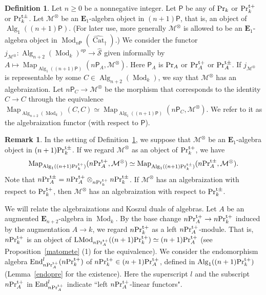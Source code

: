 \documentclass[leqno,12pt]{amsart}
\theoremstyle{plain}
\theoremstyle{definition}
\newtheorem{Definition}[Theorem]{Definition}
\newtheorem{Remark}[Theorem]{Remark}
\newcommand{\PR}{\textup{Pr}}
\newcommand{\PRTT}{\textup{Pr}^{\textup{t}+}}
\newcommand{\PRTTT}{\textup{Pr}^{\textup{t}\pm}}
\newcommand{\MMM}{\mathcal{M}}
\newcommand{\Mod}{\operatorname{Mod}}
\newcommand{\wSSS}{\widehat{\mathcal{S}}}
\newcommand{\Map}{\operatorname{Map}}
\newcommand{\Alg}{\operatorname{Alg}}
\newcommand{\End}{\operatorname{End}}
\newcommand{\vCat}{\widehat{\operatorname{Cat}}_\dagger}
\newcommand{\eone}{\mathbf{E}_1}
\newcommand{\LMod}{\operatorname{LMod}}
\begin{document}
\begin{Definition}
\label{algebraizationdef}
Let $n\ge0$ be a nonnegative integer.
Let $\mathsf{P}$ be any of $\PR_k$ or $\PRTT_k$ or $\PRTTT_k$.
Let $\MMM^\otimes$ be an $\eone$-algebra object in $(n+1)\mathsf{P}$, that is, an object of $\Alg_1((n+1)\mathsf{P})$.
(For later use, more generally $\MMM^\otimes$ is allowed to be an $\eone$-algebra object in $\Mod_{n\mathsf{P}}(\vCat)$.)
We consider the functor $j_{\MMM^\otimes}:\Alg_{n+2}(\Mod_k)^{op}\to \wSSS$ given informally by $A\mapsto \Map_{\Alg_1((n+1)\mathsf{P})}(n\mathsf{P}_A,\MMM^\otimes)$.
Here $\mathsf{P}_A$ is $\PR_A$ or $\PRTT_A$ or $\PRTTT_A$.
If $j_{\MMM^\otimes}$ is representable by some $C\in \Alg_{n+2}(\Mod_k)$, we say that $\MMM^{\otimes}$ has an algebraization.
Let $n\mathsf{P}_C\to \MMM^\otimes$ be the morphism
that corresponds to the identity $C\to C$ through the equivalence $\Map_{\Alg_{n+2}(\Mod_k)}(C,C)\simeq \Map_{\Alg_1((n+1)\mathsf{P})}(n\mathsf{P}_C,\MMM^\otimes)$.
We refer to it as the algebraization functor  (with respect to $\mathsf{P}$).
\end{Definition}








\begin{Remark}
In the setting of Definition~\ref{algebraizationdef},
we suppose that  $\MMM^\otimes$ be an $\eone$-algebra object in $(n+1)\PRTTT_k$.
If we regard $\MMM^\otimes$ as an object of $\PRTT_k$, we have
\[
\Map_{\Alg_1((n+1)\PRTT_k)}(n\PRTT_A,\MMM^\otimes)\simeq \Map_{\Alg_1((n+1)\PRTTT_k)}(n\PRTTT_A,\MMM^\otimes).
\]
Note that $n\PRTTT_A=n\PRTT_A\otimes_{n\PRTT_k}n\PRTTT_k$.
If $\MMM^\otimes$ has an algebraization with respect to $\PRTT_k$, then $\MMM^\otimes$  has an algebraization with respect to $\PRTTT_k$.
\end{Remark}


We will relate the algebraizations and Koszul duals of algebras.
Let $A$ be an augmented $\mathbf{E}_{n+2}$-algebra in $\Mod_k$.
By the base change $n\PRTT_A\to n\PRTT_k$ induced by the augmentation $A\to k$,
we regard $n\PRTT_k$ as a left $n\PRTT_A$-module.
That is, $n\PRTT_k$ is an object of $\LMod_{n\PRTT_A}((n+1)\PRTT_k)\simeq (n+1)\PRTT_A$ (see Proposition~\ref{matomete} (1) for the equivalence).
We consider the endomorphism algebra $\End_{n\PRTT_A}^l(n\PRTT_k)$ of $n\PRTT_k\in (n+1)\PRTT_A$, defined in $\Alg_1( (n+1)\PRTT_k)$
(Lemma~\ref{endopre} for the existence).
Here the superscript $l$ and the subscript $n\PRTT_A$ in $\End_{n\PRTT_A}^l$ indicate ``left $n\PRTT_A$-linear functors".
\end{document}
